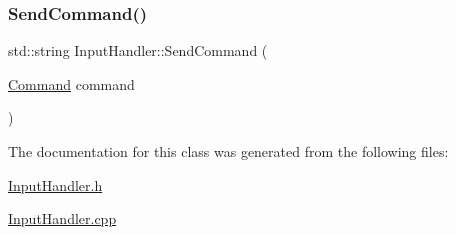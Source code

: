 \subsubsection{\texorpdfstring{SendCommand()}{SendCommand()}}
{\footnotesize\ttfamily std\+::string Input\+Handler\+::\+Send\+Command (\begin{DoxyParamCaption}\item[{\mbox{\hyperlink{_commands_8h_a16664d91c016c57e51eff6cbd28e32cf}{Command}}}]{command }\end{DoxyParamCaption})}



The documentation for this class was generated from the following files\+:\begin{DoxyCompactItemize}
\item 
\mbox{\hyperlink{_input_handler_8h}{Input\+Handler.\+h}}\item 
\mbox{\hyperlink{_input_handler_8cpp}{Input\+Handler.\+cpp}}\end{DoxyCompactItemize}
